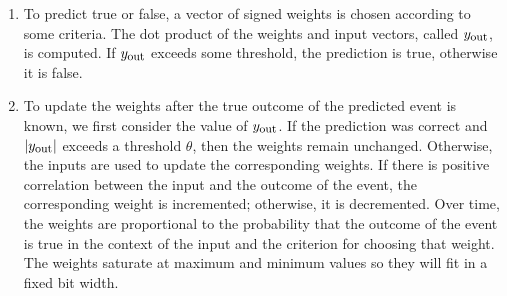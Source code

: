 \begin{enumerate}
\item To predict true or false, a vector of signed weights is chosen according to some criteria. 
The dot product of the weights and input vectors, called $y_{\mbox{\small out}}$, is computed. 
If $y_{\mbox{\small out}}$ exceeds some threshold, the prediction is true, otherwise it is false.

\item To update the weights after the true outcome of the predicted event is
known, we first consider the value of $y_{\mbox{\small out}}$. If the
prediction was correct and $|y_{\mbox{\small out}}|$ exceeds a threshold
$\theta$, then the weights remain unchanged. Otherwise, the inputs are used to
update the corresponding weights.  If there is positive correlation between
the input and the outcome of the event, the corresponding weight is
incremented; otherwise, it is decremented. Over time, the weights are
proportional to the probability that the outcome of the event is true in the
context of the input and the criterion for choosing that weight. The weights
saturate at maximum and minimum values so they will fit in a fixed bit width.
\end{enumerate}

